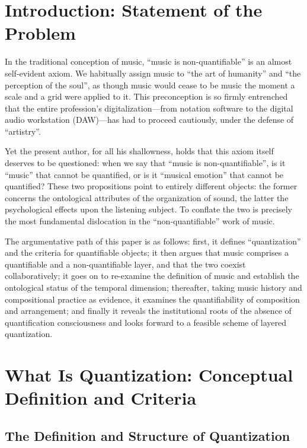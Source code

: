 \documentclass[11pt,a4paper]{article}
\begin{document}
\section{Introduction: Statement of the Problem}

In the traditional conception of music, ``music is non-quantifiable'' is an almost
self-evident axiom. We habitually assign music to ``the art of humanity'' and ``the
perception of the soul'', as though music would cease to be music the moment a scale and a
grid were applied to it. This preconception is so firmly entrenched that the entire
profession's digitalization---from notation software to the digital audio workstation
(DAW)---has had to proceed cautiously, under the defense of ``artistry''.

Yet the present author, for all his shallowness, holds that this axiom itself deserves to
be questioned: when we say that ``music is non-quantifiable'', is it ``music'' that cannot
be quantified, or is it ``musical emotion'' that cannot be quantified? These two
propositions point to entirely different objects: the former concerns the ontological
attributes of the organization of sound, the latter the psychological effects upon the
listening subject. To conflate the two is precisely the most fundamental dislocation in the
``non-quantifiable'' work of music.

The argumentative path of this paper is as follows: first, it defines ``quantization'' and
the criteria for quantifiable objects; it then argues that music comprises a quantifiable
and a non-quantifiable layer, and that the two coexist collaboratively; it goes on to
re-examine the definition of music and establish the ontological status of the temporal
dimension; thereafter, taking music history and compositional practice as evidence, it
examines the quantifiability of composition and arrangement; and finally it reveals the
institutional roots of the absence of quantification consciousness and looks forward to a
feasible scheme of layered quantization.

\section{What Is Quantization: Conceptual Definition and Criteria}

\subsection{The Definition and Structure of Quantization}
\end{document}
